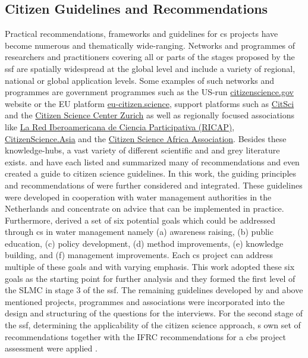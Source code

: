 \subsection{Citizen Guidelines and Recommendations}

Practical recommendations, frameworks and guidelines for \acrlong*{cs} projects have become numerous and thematically wide-ranging. Networks and programmes of researchers and practitioners covering all or parts of the stages proposed by the \acrshort*{ssf} are spatially widespread at the global level and include a variety of regional, national or global application levels. Some examples of such networks and programmes are government programmes such as the US-run \href{https://www.citizenscience.gov/}{citizenscience.gov} website or the EU platform \href{https://eu-citizen.science/}{eu-citizen.science}, support platforms such as \href{https://citsci.org/}{CitSci} and the \href{https://citizenscience.ch/en/}{Citizen Science Center Zurich} as well as regionally focused associations like \href{http://cienciaparticipativa.net/la-ricap/}{La Red Iberoamericana de Ciencia Participativa (RICAP)}, \href{https://citizenscience.asia/}{CitizenScience.Asia} and the \href{https://www.usiu.ac.ke/citsci-africa-association/}{Citizen Science Africa Association}.\newline
Besides these knowledge-hubs, a vast variety of different scientific and and grey literature exists. \autocite{fraislCitizenScienceEnvironmental2022} and \autocite{westonCommunityBasedWaterMonitoring2015} have each listed and summarized many of recommendations and \autocite{garciaFindingWhatYou2021} even created a guide to citizen science guidelines. In this work, the guiding principles and recommendations of \autocite{minkmanCitizenScienceWater2015} were further considered and integrated. These guidelines were developed in cooperation with water management authorities in the Netherlands and concentrate on advice that can be implemented in practice. Furthermore, \autocite{minkmanCitizenScienceWater2015} derived a set of six potential goals which could be addressed through \acrlong*{cs} in water management namely (a) awareness raising, (b) public education, (c) policy development, (d) method improvements, (e) knowledge building, and (f) management improvements. Each \acrshort*{cs} project can address multiple of these goals and with varying emphasis. This work adopted these six goals as the starting point for further analysis and they formed the first level of the SLMC in stage 3 of the \acrshort*{ssf}. The remaining guidelines developed by \autocite{minkmanCitizenScienceWater2015} and above mentioned projects, programmes and associations were incorporated into the design and structuring of the questions for the interviews.
For the second stage of the \acrshort*{ssf}, determining the applicability of the citizen science approach, \autocite{fraislCitizenScienceEnvironmental2022}s own set of recommendations together with the IFRC recommendations for a \acrshort*{cbs} project assessment were applied \autocite{goodermoteConductingAssessmentCommunitybased2020}.

